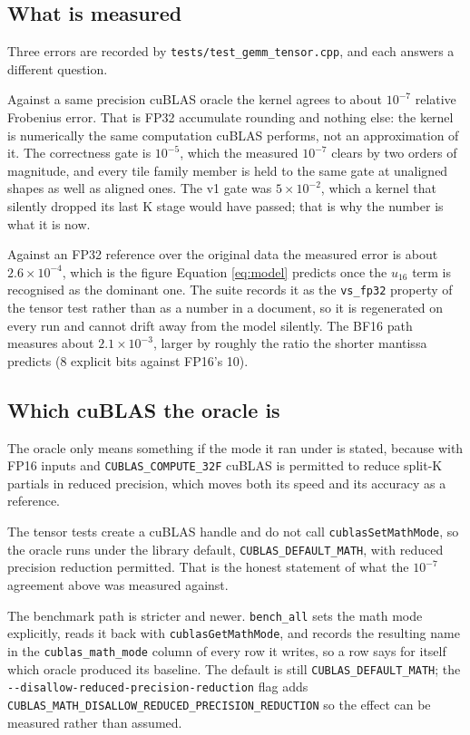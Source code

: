 \subsection{What is measured}

Three errors are recorded by \texttt{tests/test\_gemm\_tensor.cpp}, and each
answers a different question.

Against a same precision cuBLAS oracle the kernel agrees to about $10^{-7}$
relative Frobenius error. That is FP32 accumulate rounding and nothing else: the
kernel is numerically the same computation cuBLAS performs, not an approximation
of it. The correctness gate is $10^{-5}$, which the measured $10^{-7}$ clears by
two orders of magnitude, and every tile family member is held to the same gate at
unaligned shapes as well as aligned ones. The v1 gate was $5 \times 10^{-2}$,
which a kernel that silently dropped its last K stage would have passed; that is
why the number is what it is now.

Against an FP32 reference over the original data the measured error is about
$2.6 \times 10^{-4}$, which is the figure Equation \ref{eq:model} predicts once
the $u_{16}$ term is recognised as the dominant one. The suite records it as the
\texttt{vs\_fp32} property of the tensor test rather than as a number in a
document, so it is regenerated on every run and cannot drift away from the model
silently. The BF16 path measures about $2.1 \times 10^{-3}$, larger by roughly the
ratio the shorter mantissa predicts (8 explicit bits against FP16's 10).

\subsection{Which cuBLAS the oracle is}

The oracle only means something if the mode it ran under is stated, because with
FP16 inputs and \texttt{CUBLAS\_COMPUTE\_32F} cuBLAS is permitted to reduce
split-K partials in reduced precision, which moves both its speed and its accuracy
as a reference.

The tensor tests create a cuBLAS handle and do not call
\texttt{cublasSetMathMode}, so the oracle runs under the library default,
\texttt{CUBLAS\_DEFAULT\_MATH}, with reduced precision reduction permitted. That
is the honest statement of what the $10^{-7}$ agreement above was measured
against.

The benchmark path is stricter and newer. \texttt{bench\_all} sets the math mode
explicitly, reads it back with \texttt{cublasGetMathMode}, and records the
resulting name in the \texttt{cublas\_math\_mode} column of every row it writes,
so a row says for itself which oracle produced its baseline. The default is
still \texttt{CUBLAS\_DEFAULT\_MATH}; the
\texttt{-{}-disallow-reduced-precision-reduction} flag adds
\texttt{CUBLAS\_MATH\_DISALLOW\_REDUCED\_PRECISION\_REDUCTION} so the effect can be
measured rather than assumed.

